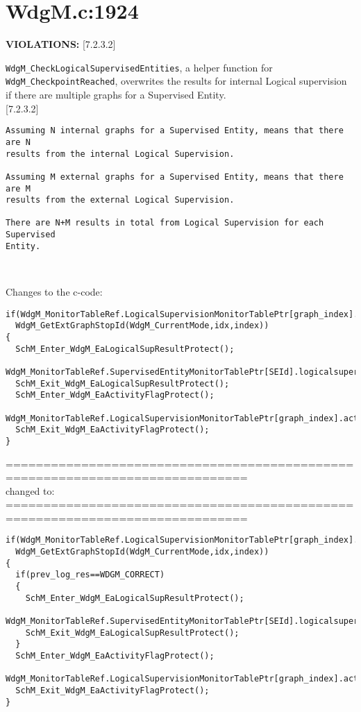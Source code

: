 \documentclass[11pt,a4paper]{article}
\begin{document}
\section{WdgM.c:1924}
\textbf{VIOLATIONS:} [7.2.3.2]\\[0.5cm]

\lstset{language=autosar}

\lstinline!WdgM_CheckLogicalSupervisedEntities!, a helper function for
\lstinline!WdgM_CheckpointReached!, overwrites the results for internal Logical
supervision if there are multiple graphs for a Supervised Entity.\\

[7.2.3.2]
\begin{lstlisting}
Assuming N internal graphs for a Supervised Entity, means that there are N
results from the internal Logical Supervision.

Assuming M external graphs for a Supervised Entity, means that there are M
results from the external Logical Supervision.

There are N+M results in total from Logical Supervision for each Supervised
Entity.
\end{lstlisting}~\\

\lstset{language=c}

Changes to the c-code:
\begin{lstlisting}
if(WdgM_MonitorTableRef.LogicalSupervisionMonitorTablePtr[graph_index].most_recently_reported==
  WdgM_GetExtGraphStopId(WdgM_CurrentMode,idx,index))
{
  SchM_Enter_WdgM_EaLogicalSupResultProtect();
  WdgM_MonitorTableRef.SupervisedEntityMonitorTablePtr[SEId].logicalsupervision_result=WDGM_CORRECT;
  SchM_Exit_WdgM_EaLogicalSupResultProtect();
  SchM_Enter_WdgM_EaActivityFlagProtect();
  WdgM_MonitorTableRef.LogicalSupervisionMonitorTablePtr[graph_index].activity_flag=FALSE;
  SchM_Exit_WdgM_EaActivityFlagProtect();
}
\end{lstlisting}
==============================================================================\\
changed to:\\
==============================================================================
\begin{lstlisting}
if(WdgM_MonitorTableRef.LogicalSupervisionMonitorTablePtr[graph_index].most_recently_reported==
  WdgM_GetExtGraphStopId(WdgM_CurrentMode,idx,index))
{
  if(prev_log_res==WDGM_CORRECT)
  {
    SchM_Enter_WdgM_EaLogicalSupResultProtect();
    WdgM_MonitorTableRef.SupervisedEntityMonitorTablePtr[SEId].logicalsupervision_result=WDGM_CORRECT;
    SchM_Exit_WdgM_EaLogicalSupResultProtect();
  }
  SchM_Enter_WdgM_EaActivityFlagProtect();
  WdgM_MonitorTableRef.LogicalSupervisionMonitorTablePtr[graph_index].activity_flag=FALSE;
  SchM_Exit_WdgM_EaActivityFlagProtect();
}
\end{lstlisting}
\newpage
\end{document}
